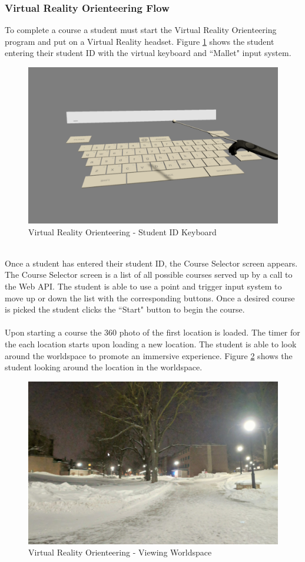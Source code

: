 \subsubsection{Virtual Reality Orienteering Flow}
To complete a course a student must start the Virtual Reality Orienteering program and put on a Virtual Reality headset. Figure \ref{VR Keyboard} shows the student entering their student ID with the virtual keyboard and ``Mallet" input system.
\begin{figure}[h]
	\centering
	\includegraphics[width=.6\textwidth]{Requirements/assets/vr-keyboard.png}
	\caption[Virtual Reality Orienteering - Student ID Keyboard]{\label{VR Keyboard}Virtual Reality Orienteering - Student ID Keyboard}
\end{figure} 
\\
Once a student has entered their student ID, the Course Selector screen appears. The Course Selector screen is a list of all possible courses served up by a call to the Web API. The student is able to use a point and trigger input system to move up or down the list with the corresponding buttons. Once a desired course is picked the student clicks the ``Start" button to begin the course.\\
\\
Upon starting a course the 360 photo of the first location is loaded. The timer for the each location starts upon loading a new location. The student is able to look around the worldspace to promote an immersive experience. Figure \ref{VR Worldspace} shows the student looking around the location in the worldspace. 
\begin{figure}[htb]
	\centering
	\includegraphics[width=.5\textwidth]{Requirements/assets/vr-worldspace.png}
	\caption[Virtual Reality Orienteering - Veiwing Worldspace]{\label{VR Worldspace}Virtual Reality Orienteering - Viewing Worldspace}
\end{figure} \clearpage
